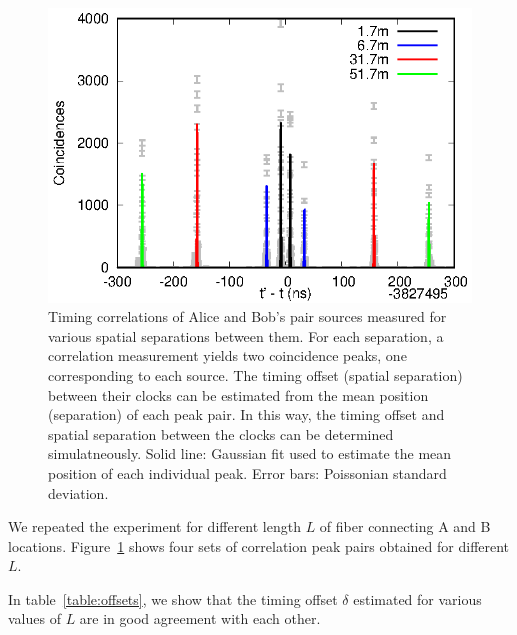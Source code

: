 \documentclass[aps,pra,onecolumn, superscriptaddress]{revtex4}
\begin{document}
\begin{figure}[htbp]
  \centering
  \includegraphics[width=16cm]{figures/g2/g2.eps}
  \caption{\label{fig:g2}
  Timing correlations of Alice and Bob's pair sources measured for various spatial separations between them.  
  For each separation, a correlation measurement yields two coincidence peaks, 
  one corresponding to each source.
  The timing offset (spatial separation) between their clocks can be estimated from the mean position (separation) of each peak pair.
  In this way, the timing offset and spatial separation between the clocks can be determined simulatneously.
  Solid line: Gaussian fit used to estimate the mean position of each individual peak. 
  Error bars: Poissonian standard deviation.
  }
\end{figure}

We repeated the experiment for different length $L$ of fiber connecting A and B locations.
Figure~\ref{fig:g2} shows four sets of correlation peak pairs obtained for different $L$.


In table~\ref{table:offsets}, we show that the timing offset $\delta$ estimated for various values of $L$ are in good agreement with each other.
\end{document}

